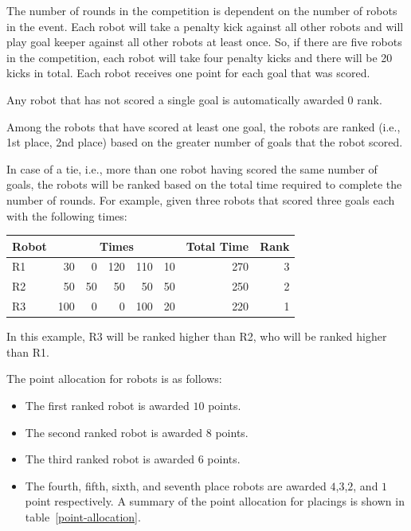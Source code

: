 \documentclass[12pt]{hurocup}
\begin{document}
\begin{lawlist}[PK]

\item The number of rounds in the competition is dependent on the
  number of robots in the event. Each robot will take a penalty kick
  against all other robots and will play goal keeper against all other
  robots at least once. So, if there are five robots in the competition,
  each robot will take four penalty kicks and there will be 20 kicks in
  total. Each robot receives one point for each goal that was scored.

\item Any robot that has not scored a single goal is automatically
  awarded 0 rank.

\item Among the robots that have scored at least one goal, the robots
  are ranked (i.e., 1st place, 2nd place) based on the greater number
  of goals that the robot scored.

\item In case of a tie, i.e., more than one robot having scored the
  same number of goals, the robots will be ranked based on the total
  time required to complete the number of rounds. For example, given
  three robots that scored three goals each with the following times:

      \begin{center}
        \begin{tabular}{l|rrrrr|r|r|}
          \hline
          Robot & \multicolumn{5}{c}{Times} & Total Time & Rank \\
          \hline
          R1 & 30 & 0 & 120 & 110 & 10 & 270 & 3 \\
          R2 & 50 & 50 & 50 & 50 & 50 & 250 & 2 \\
          R3 & 100 & 0 & 0 & 100 & 20 & 220 & 1 \\
          \hline
        \end{tabular}
      \end{center}

  In this example, R3 will be ranked higher than R2, who will be
  ranked higher than R1.

\item The point allocation for robots is as follows:
  \begin{itemize}
  \item The first ranked robot is awarded $10$ points.
  \item The second ranked robot is awarded $8$ points.
  \item The third ranked robot is awarded $6$ points.
  \item The fourth, fifth, sixth, and seventh place robots are awarded
    $4$,$3$,$2$, and $1$ point respectively.  A summary of the point
    allocation for placings is shown in table~\ref{point-allocation}.


\end{itemize}
\end{lawlist}
\end{document}
